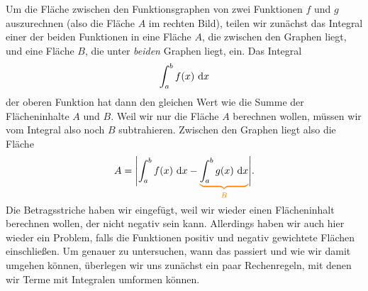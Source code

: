 \documentclass[../../main.tex]{subfiles}
\begin{document}
Um die Fläche zwischen den Funktionsgraphen von zwei Funktionen $f$ und $g$ auszurechnen (also die Fläche $A$ im rechten
Bild), teilen wir zunächst das Integral einer der beiden Funktionen in eine Fläche $A$,
die zwischen den Graphen liegt, und eine Fläche $B$, die unter \emph{beiden} Graphen liegt, ein. Das Integral 
\[\int_a^bf(x)\mathop{}\mathrm{d} x\]
der oberen
Funktion hat dann den gleichen Wert wie die Summe der Flächeninhalte $A$ und $B$. Weil wir nur die Fläche $A$ berechnen
wollen, müssen wir vom Integral also noch $B$ subtrahieren. Zwischen den Graphen liegt also die Fläche
\[A=\Biggl|\int_a^bf(x)\diff x-\colorbrace{\int_a^bg(x)\diff x}{B}\Biggr|.\]
Die Betragsstriche haben wir eingefügt, weil wir wieder einen Flächeninhalt berechnen wollen, der nicht
negativ sein kann. Allerdings haben wir auch hier wieder ein Problem, falls die Funktionen positiv und negativ
gewichtete Flächen einschließen. Um genauer zu untersuchen, wann das passiert und wie wir damit umgehen können,
überlegen wir uns zunächst ein paar Rechenregeln, mit denen wir Terme mit Integralen umformen können.
\end{document}
